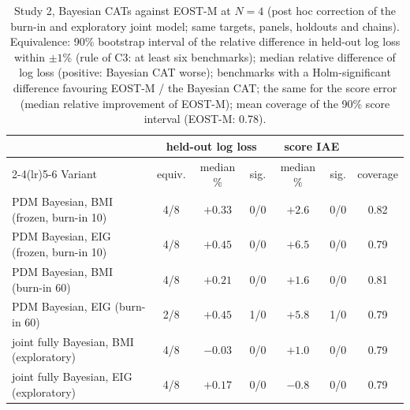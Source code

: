 \begin{table}[tbp]
\centering\footnotesize
\caption{Study 2, Bayesian CATs against EOST-M at $N=4$ (post hoc correction of the burn-in and exploratory joint model; same targets, panels, holdouts and chains). Equivalence: 90\% bootstrap interval of the relative difference in held-out log loss within $\pm1\%$ (rule of C3: at least six benchmarks); median relative difference of log loss (positive: Bayesian CAT worse); benchmarks with a Holm-significant difference favouring EOST-M / the Bayesian CAT; the same for the score error (median relative improvement of EOST-M); mean coverage of the 90\% score interval (EOST-M: 0.78).}
\label{tab:fbfixfour}
\setlength{\tabcolsep}{3pt}
\begin{tabular}{@{}lcccccc@{}}
\toprule
 & \multicolumn{3}{c}{held-out log loss} & \multicolumn{2}{c}{score IAE} & \\
\cmidrule(lr){2-4}\cmidrule(lr){5-6}
Variant & equiv. & median \% & sig. & median \% & sig. & coverage \\
\midrule
PDM Bayesian, BMI (frozen, burn-in 10) & 4/8 & $+0.33$ & 0/0 & $+2.6$ & 0/0 & 0.82 \\
PDM Bayesian, EIG (frozen, burn-in 10) & 4/8 & $+0.45$ & 0/0 & $+6.5$ & 0/0 & 0.79 \\
PDM Bayesian, BMI (burn-in 60) & 4/8 & $+0.21$ & 0/0 & $+1.6$ & 0/0 & 0.81 \\
PDM Bayesian, EIG (burn-in 60) & 2/8 & $+0.45$ & 1/0 & $+5.8$ & 1/0 & 0.79 \\
joint fully Bayesian, BMI (exploratory) & 4/8 & $-0.03$ & 0/0 & $+1.0$ & 0/0 & 0.79 \\
joint fully Bayesian, EIG (exploratory) & 4/8 & $+0.17$ & 0/0 & $-0.8$ & 0/0 & 0.79 \\
\bottomrule
\end{tabular}
\end{table}
